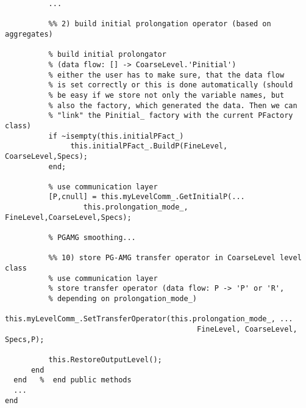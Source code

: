 \begin{verbatim}
          ...

          %% 2) build initial prolongation operator (based on aggregates)

          % build initial prolongator 
          % (data flow: [] -> CoarseLevel.'Pinitial')
          % either the user has to make sure, that the data flow
          % is set correctly or this is done automatically (should
          % be easy if we store not only the variable names, but
          % also the factory, which generated the data. Then we can
          % "link" the Pinitial_ factory with the current PFactory class)
          if ~isempty(this.initialPFact_)
               this.initialPFact_.BuildP(FineLevel, CoarseLevel,Specs);  
          end;

          % use communication layer
          [P,cnull] = this.myLevelComm_.GetInitialP(...
                  this.prolongation_mode_, FineLevel,CoarseLevel,Specs);

          % PGAMG smoothing...

          %% 10) store PG-AMG transfer operator in CoarseLevel level class
          % use communication layer 
          % store transfer operator (data flow: P -> 'P' or 'R',
          % depending on prolongation_mode_)
          this.myLevelComm_.SetTransferOperator(this.prolongation_mode_, ...
                                            FineLevel, CoarseLevel, Specs,P);

          this.RestoreOutputLevel();
      end
  end   %  end public methods
  ...
end
\end{verbatim}

